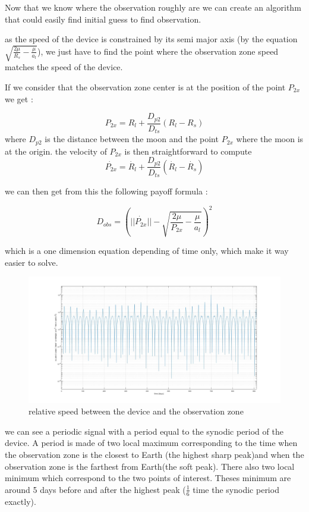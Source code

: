 \documentclass{article} %
\begin{document}
		Now that we know where the observation roughly are we can create an algorithm that could easily find initial guess to find observation.
		
		as the speed of the device is constrained by its semi major axis (by the equation $\sqrt{\frac{2\mu}{R_s}-\frac{\mu}{a_l}}$), we just have to find the point where the observation zone speed matches the speed of the device.
			
		If we consider that the observation zone center is at the position of the point $P_{2x}$ we get :
		
		$$
		P_{2x}=R_l+\frac{D_{p2}}{D_{ts}}(R_l-R_s)
		$$
		where $D_{p2}$ is the distance between the moon and the point $P_{2x}$ where the moon is at the origin.
		the velocity of $P_{2x}$ is then straightforward to compute
		$$
		\dot{P_{2x}}=\dot{R_l}+\frac{D_{p2}}{D_{ts}}(\dot{R_l}-\dot{R_s})
		$$
		
		we can then get from this the following payoff formula :
		
		$$
		D_{obs}=\left(||\dot{P_{2x}}||-\sqrt{\frac{2\mu}{P_{2x}}-\frac{\mu}{a_l}}\right)^2
		$$  
		
		which is a one dimension equation depending of time only, which make it way easier to solve.
		
		\begin{figure}[h]
			\includegraphics[width=12cm]{images/graph.jpg}
			\caption{relative speed between the device and the observation zone}
		\end{figure}
		
		we can see a periodic signal with a period equal to the synodic period of the device. A period is made of two local maximum corresponding to the time when the observation zone is the closest to Earth (the highest sharp peak)and when the observation zone is the farthest from Earth(the soft peak). There also two local minimum which correspond to the two points of interest. Theses minimum are around 5 days before and after the highest peak ($\frac{1}{6}$ time the synodic period exactly). 
		
\end{document}
